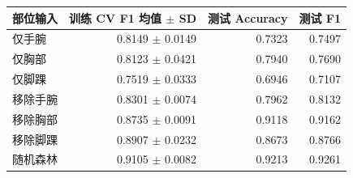 \begin{tabular}{lrrr}
\toprule
部位输入 & 训练 CV F1 均值 $\pm$ SD & 测试 Accuracy & 测试 F1 \\
\midrule
仅手腕 & 0.8149 $\pm$ 0.0149 & 0.7323 & 0.7497 \\
仅胸部 & 0.8123 $\pm$ 0.0421 & 0.7940 & 0.7690 \\
仅脚踝 & 0.7519 $\pm$ 0.0333 & 0.6946 & 0.7107 \\
移除手腕 & 0.8301 $\pm$ 0.0074 & 0.7962 & 0.8132 \\
移除胸部 & 0.8735 $\pm$ 0.0091 & 0.9118 & 0.9162 \\
移除脚踝 & 0.8907 $\pm$ 0.0232 & 0.8673 & 0.8766 \\
随机森林 & 0.9105 $\pm$ 0.0082 & 0.9213 & 0.9261 \\
\bottomrule
\end{tabular}
